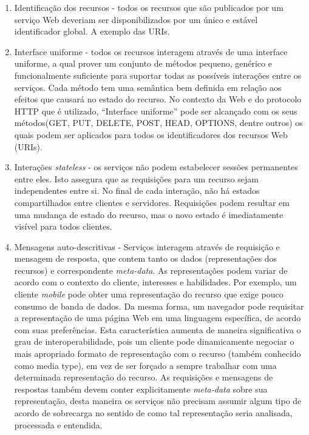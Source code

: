 \begin{enumerate}
\item Identificação dos recursos - todos os recursos que são publicados por um serviço Web deveriam ser disponibilizados por um único e estável identificador global\cite{Pautasso:2014}. A exemplo das URIs\cite{Franca:2011}.
\item Interface uniforme - todos os recursos interagem através de uma interface uniforme, a qual prover um conjunto de métodos pequeno, genérico e funcionalmente suficiente para suportar todas as possíveis interações entre os serviços. Cada método tem uma semântica bem definida em relação aos efeitos que causará no estado do recurso. No contexto da Web e do protocolo HTTP que é utilizado, ``Interface uniforme'' pode ser alcançado com os seus  métodos(GET, PUT, DELETE, POST, HEAD, OPTIONS, dentre outros) os quais podem ser aplicados para todos os identificadores dos recursos Web (URIs).\cite{Pautasso:2014}
\item Interações \textit{stateless} - os serviços não podem estabelecer sessões permanentes entre eles. Isto assegura que as requisições para um recurso sejam independentes entre si. No final de cada interação, não há estados compartilhados entre clientes e servidores. Requisições podem resultar em uma mudança de estado do recurso, mas o novo estado é imediatamente visível para todos clientes.\cite{Pautasso:2014}
\item Mensagens auto-descritivas - Serviços interagem através de requisição e mensagem de resposta, que contem tanto os dados (representações dos recursos) e correspondente \textit{meta-data}. As representações podem variar de acordo com o contexto do cliente, interesses e habilidades. Por exemplo, um cliente \textit{mobile} pode obter uma representação do recurso que exige pouco consumo de banda de dados. Da mesma forma, um navegador pode requisitar a representação de uma página Web em uma linguagem específica, de acordo com suas preferências. Esta característica aumenta de maneira significativa o grau de interoperabilidade, pois um cliente pode dinamicamente negociar o mais apropriado formato de representação com o recurso (também conhecido como media type), em vez de ser forçado a sempre trabalhar com uma determinada representação do recurso. As requisições e mensagens de respostas também devem conter explicitamente \textit{meta-data} sobre sua representação, desta maneira os serviços não precisam assumir algum tipo de acordo de sobrecarga no sentido de como tal representação seria analisada, processada e entendida.\cite{Pautasso:2014}

\end{enumerate}
